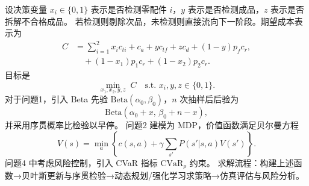 设决策变量 $x_i\in\{0,1\}$ 表示是否检测零配件 $i$，$y$ 表示是否检测成品，$z$ 表示是否拆解不合格成品。
若检测则剔除次品，未检测则直接流向下一阶段。期望成本表示为
\begin{align}
C &= \sum_{i=1}^2 x_i c_{ti} + c_a + y c_{tf} + z c_d + (1-y) p_f c_r, \\
&\quad + (1-x_1)p_1 c_r + (1-x_2)p_2 c_r.
\end{align}
目标是
\begin{equation}
\min_{x_1,x_2,y,z} \; C \quad \text{s.t. } x_i,y,z\in\{0,1\}.
\end{equation}
对于问题1，引入 Beta 先验 $\mathrm{Beta}(\alpha_0,\beta_0)$，$n$ 次抽样后后验为
\begin{equation}
\mathrm{Beta}(\alpha_0+x,\,\beta_0+n-x),
\end{equation}
并采用序贯概率比检验以早停。
问题2 建模为 MDP，价值函数满足贝尔曼方程
\begin{equation}
V(s)=\min_a \left\{ c(s,a)+\gamma\sum_{s'}P(s'|s,a)V(s') \right\}.
\end{equation}
问题4 中考虑风险控制，引入 CVaR 指标 $\mathrm{CVaR}_\rho$ 约束。
求解流程：构建上述函数→贝叶斯更新与序贯检验→动态规划/强化学习求策略→仿真评估与风险分析。
